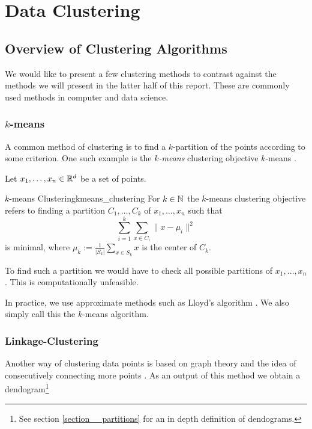 \chapter{Data Clustering}

\section{Overview of Clustering Algorithms}
We would like to present a few clustering methods to contrast against the methods we will present in the latter half of this report. These are commonly used methods in computer and data science.

\subsection{$k$-means}
A common method of clustering is to find a $k$-partition of the points according to some criterion.
One such example is the \emph{$k$-means} clustering objective $k$-means \cite[Section~3.1]{Scitovski2021}.

Let $x_1, \dots, x_n \in \mathbb R^d$ be a set of points.

\begin{definition}{$k$-means Clustering}{kmeans_clustering}
For $k \in \mathbb N$ the $k$-means clustering objective refers to finding a partition $C_1, \dots, C_k$ of $x_1, \dots, x_n$ such that
\begin{equation*}
\label{eq:kmean_optimization}
    \sum_{i = 1}^k \sum_{x \in C_i} \|x - \mu_i\|^2
\end{equation*}
is minimal, where $\mu_k := \frac{1}{|S_k|}\sum_{x \in S_k} x$ is the center of $C_k$.
\end{definition}
To find such a partition we would have to check all possible partitions of $x_1, \dots, x_n$. This is computationally unfeasible.

In practice, we use approximate methods such as Lloyd's algorithm \cite[Section~3.1.2]{Scitovski2021}.
We also simply call this the $k$-means algorithm.

\subsection{Linkage-Clustering}
Another way of clustering data points is based on graph theory and the idea of consecutively connecting more points \cite[Section~4.2.2]{Everitt2011}.
As an output of this method we obtain a dendogram\footnote{See section \ref{section__partitions} for an in depth definition of dendograms.}

